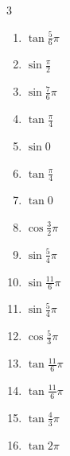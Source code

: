 \begin{multicols}{3}
\begin{enumerate}
  \item $\displaystyle \tan{\frac{5}{6}\pi}$

  \item $\displaystyle \sin{\frac{\pi}{2}}$
        \phantom{$\displaystyle =1$}

  \item $\displaystyle \sin{\frac{7}{6}\pi}$

  \item $\displaystyle \tan{\frac{\pi}{4}}$
        \phantom{$\displaystyle =1$}

  \item $\displaystyle \sin{0}$
        \phantom{$\displaystyle =0$}

  \item $\displaystyle \tan{\frac{\pi}{4}}$
        \phantom{$\displaystyle =1$}

  \item $\displaystyle \tan{0}$
        \phantom{$\displaystyle =0$}

  \item $\displaystyle \cos{\frac{3}{2}\pi}$
        \phantom{$\displaystyle =0$}

  \item $\displaystyle \sin{\frac{5}{4}\pi}$

  \item $\displaystyle \sin{\frac{11}{6}\pi}$

  \item $\displaystyle \sin{\frac{5}{4}\pi}$

  \item $\displaystyle \cos{\frac{5}{3}\pi}$

  \item $\displaystyle \tan{\frac{11}{6}\pi}$

  \item $\displaystyle \tan{\frac{11}{6}\pi}$

  \item $\displaystyle \tan{\frac{4}{3}\pi}$

  \item $\displaystyle \tan{2\pi}$
        \phantom{$\displaystyle =0$}


\end{enumerate}
\end{multicols}
